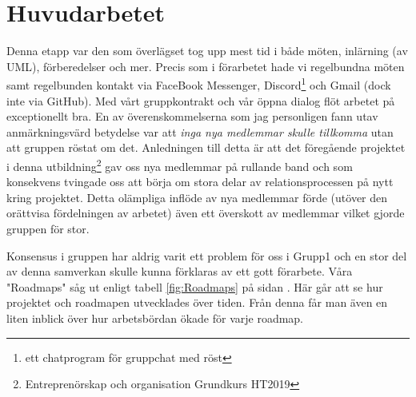 \documentclass{article}
\theoremstyle{remark}                                         %
\begin{document}
\section{Huvudarbetet}
Denna etapp var den som överlägset tog upp mest tid i både möten, inlärning (av UML), förberedelser och mer. Precis som i förarbetet hade vi regelbundna möten samt regelbunden kontakt via FaceBook Messenger, Discord\footnote{ett chatprogram för gruppchat med röst} och Gmail (dock inte via GitHub). Med vårt gruppkontrakt och vår öppna dialog flöt arbetet på exceptionellt bra. En av överenskommelserna som jag personligen fann utav anmärkningsvärd betydelse var att \emph{inga nya medlemmar skulle tillkomma} utan att gruppen röstat om det. Anledningen till detta är att det föregående projektet i denna utbildning\footnote{Entreprenörskap och organisation Grundkurs HT2019} gav oss nya medlemmar på rullande band och som konsekvens tvingade oss att börja om stora delar av relationsprocessen på nytt kring projektet. Detta olämpliga inflöde av nya medlemmar förde (utöver den orättvisa fördelningen av arbetet) även ett överskott av medlemmar vilket gjorde gruppen för stor.

Konsensus i gruppen har aldrig varit ett problem för oss i Grupp1 och en stor del av denna samverkan skulle kunna förklaras av ett gott förarbete. Våra "Roadmaps" såg ut enligt tabell \ref{fig:Roadmaps} på sidan \pageref{fig:Roadmaps}. Här går att se hur projektet och roadmapen utvecklades över tiden. Från denna får man även en liten inblick över hur arbetsbördan ökade för varje roadmap.
\end{document}
